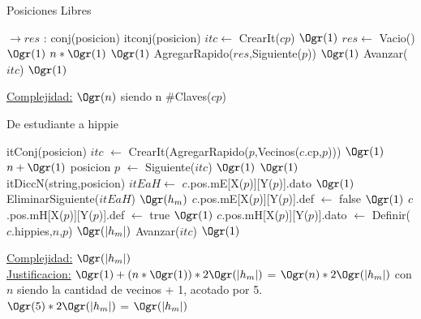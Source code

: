 \begin{Algoritmos}
\begin{algorithm}[H]
\caption{Posiciones Libres}
\begin{algorithmic}[1]
  $\to res$ : conj(posicion)
	\State itconj(posicion) $itc \gets$ CrearIt($cp$) \Comment $\Ogr(1)$
	\State $res \gets$ Vacio() \Comment $\Ogr(1)$
	 \Comment $n*\Ogr(1)$
		 \Comment $\Ogr(1)$
			\State AgregarRapido($res$,Siguiente($p$)) \Comment $\Ogr(1)$
		\EndIf
		\State Avanzar($itc$) \Comment $\Ogr(1)$
	\EndWhile
\EndProcedure
\end{algorithmic}
\underline{Complejidad:} $\Ogr(n)$ siendo n $\#$Claves($cp$)
\end{algorithm}


\begin{algorithm}[H]
\caption{De estudiante a hippie}
\begin{algorithmic}[1]
	\State itConj(posicion) $itc$ $\gets$ CrearIt(AgregarRapido($p$,Vecinos($c$.cp,$p$))) \Comment $\Ogr(1)$
	 \Comment $n+\Ogr(1)$
	\State posicion $p$ $\gets$ Siguiente($itc$) \Comment $\Ogr(1)$
		 \Comment $\Ogr(1)$ 
			\State itDiccN(string,posicion) $itEaH \gets$ $c$.pos.mE[X($p$)][Y($p$)].dato \Comment $\Ogr(1)$
			\State EliminarSiguiente($itEaH$) \Comment $\Ogr(h_m)$
			\State $c$.pos.mE[X($p$)][Y($p$)].def $\gets$ false \Comment $\Ogr(1)$
			\State $c$.pos.mH[X($p$)][Y($p$)].def $\gets$ true \Comment $\Ogr(1)$
			\State $c$.pos.mH[X($p$)][Y($p$)].dato $\gets$ Definir($c$.hippies,$n$,$p$) \Comment $\Ogr(|h_m|)$
		\EndIf
		\State Avanzar($itc$) \Comment $\Ogr(1)$
	\EndWhile
	\EndProcedure
\end{algorithmic}
\underline{Complejidad:} $\Ogr(|h_m|)$\\
\underline{Justificacion:} $\Ogr(1) + (n*\Ogr(1))* 2\Ogr(|h_m|)$ = $\Ogr(n)*2\Ogr(|h_m|)$ con $n$ siendo la cantidad de vecinos + 1, acotado por 5. \\
$\Ogr(5)*2\Ogr(|h_m|)$ = $\Ogr(|h_m|)$
\end{algorithm}


\end{Algoritmos}
